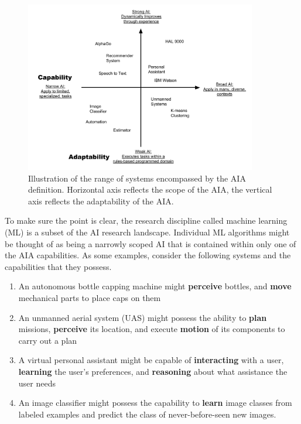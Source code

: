 	\begin{figure}[htbp]
    	\centering
     	\includegraphics[width=0.9\textwidth]{Figures/strong_weak_narrow_broad.pdf}
    	\caption{Illustration of the range of systems encompassed by the AIA definition. Horizontal axis reflects the scope of the AIA, the vertical axis reflects the adaptability of the AIA.}
        \label{fig:StrongWeak}
    \end{figure}

    To make sure the point is clear, the research discipline called machine learning (ML) is a subset of the AI research landscape. Individual ML algorithms might be thought of as being a narrowly scoped AI that is contained within only one of the AIA capabilities. As some examples, consider the following systems and the capabilities that they possess.

    \begin{enumerate}
         \item An autonomous bottle capping machine might \textbf{perceive} bottles, and \textbf{move} mechanical parts to place caps on them
         \item An unmanned aerial system (UAS) might possess the ability to \textbf{plan} missions, \textbf{perceive} its location, and execute \textbf{motion} of its components to carry out a plan
         \item A virtual personal assistant might be capable of \textbf{interacting} with a user, \textbf{learning} the user's preferences, and \textbf{reasoning} about what assistance the user needs
         \item An image classifier might possess the capability to \textbf{learn} image classes from labeled examples and predict the class of never-before-seen new images.
     \end{enumerate}

